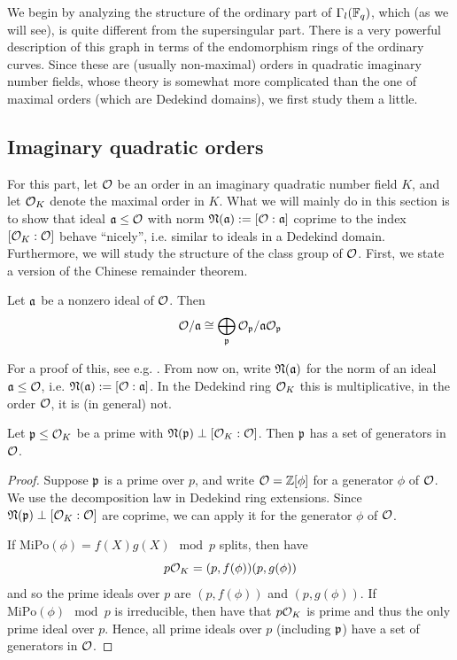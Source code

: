 
We begin by analyzing the structure of the ordinary part of $\Gamma_l(\mathbb{F}_q)$, which (as we will see), is quite different from the supersingular part.
There is a very powerful description of this graph in terms of the endomorphism rings of the ordinary curves.
Since these are (usually non-maximal) orders in quadratic imaginary number fields, whose theory is somewhat more complicated than the one of maximal orders (which are Dedekind domains), we first study them a little.

\subsection{Imaginary quadratic orders}
For this part, let $\mathcal{O}$ be an order in an imaginary quadratic number field $K$, and let $\mathcal{O}_K$ denote the maximal order in $K$.
What we will mainly do in this section is to show that ideal $\mathfrak{a} \leq \mathcal{O}$ with norm $\mathfrak{N}(\mathfrak{a}) := [\mathcal{O} : \mathfrak{a}]$ coprime to the index $[\mathcal{O}_K : \mathcal{O}]$ behave ``nicely'', i.e. similar to ideals in a Dedekind domain.
Furthermore, we will study the structure of the class group of $\mathcal{O}$.
First, we state a version of the Chinese remainder theorem.
\begin{lemma}
    Let $\mathfrak{a}$ be a nonzero ideal of $\mathcal{O}$. Then
    \begin{equation*}
        \mathcal{O}/\mathfrak{a} \cong \bigoplus_{\mathfrak{p}} \mathcal{O}_{\mathfrak{p}}/\mathfrak{a}\mathcal{O}_{\mathfrak{p}}
    \end{equation*}
\end{lemma}
For a proof of this, see e.g. \cite[Prop.~I.12.3]{neukirch}.
From now on, write $\mathfrak{N}(\mathfrak{a})$ for the norm of an ideal $\mathfrak{a} \leq \mathcal{O}$, i.e. $\mathfrak{N}(\mathfrak{a}) := [\mathcal{O} : \mathfrak{a}]$.
In the Dedekind ring $\mathcal{O}_K$ this is multiplicative, in the order $\mathcal{O}$, it is (in general) not.
\begin{lemma}
    Let $\mathfrak{p} \leq \mathcal{O}_K$ be a prime with $\mathfrak{N}(\mathfrak{p}) \perp [\mathcal{O}_K : \mathcal{O}]$.
    Then $\mathfrak{p}$ has a set of generators in $\mathcal{O}$.
\end{lemma}
\begin{proof}
    Suppose $\mathfrak{p}$ is a prime over $p$, and write $\mathcal{O} = \mathbb{Z}[\phi]$ for a generator $\phi$ of $\mathcal{O}$.
    We use the decomposition law in Dedekind ring extensions.
    Since $\mathfrak{N}(\mathfrak{p}) \perp [\mathcal{O}_K : \mathcal{O}]$ are coprime, we can apply it for the generator $\phi$ of $\mathcal{O}$.

    If $\mathrm{MiPo}(\phi) = f(X)g(X) \mod p$ splits, then have
    \begin{equation*}
        p\mathcal{O}_K = (p, f(\phi))(p, g(\phi))
    \end{equation*}
    and so the prime ideals over $p$ are $(p, f(\phi))$ and $(p, g(\phi))$.
    If $\mathrm{MiPo}(\phi) \mod p$ is irreducible, then have that $p\mathcal{O}_K$ is prime and thus the only prime ideal over $p$.
    Hence, all prime ideals over $p$ (including $\mathfrak{p}$) have a set of generators in $\mathcal{O}$.
\end{proof}
